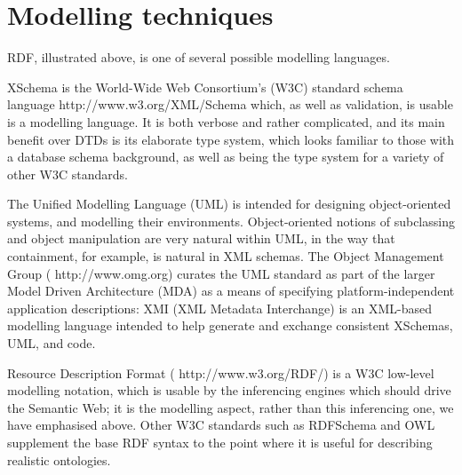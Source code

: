 \documentclass[11pt,twoside]{article}
\begin{document}
\section{Modelling techniques\label{s:techniques}}

RDF, illustrated above, is one of several possible modelling languages.

XSchema is the World-Wide Web Consortium's (W3C) \htmladdnormallink
{standard schema language} {http://www.w3.org/XML/Schema} which, as
well as validation, is usable is a modelling language.  It is both
verbose and rather complicated, and its main benefit over DTDs is its
elaborate type system, which looks familiar to those with a database
schema background, as well as being the type system for a variety of
other W3C standards.

The Unified Modelling Language (UML) is intended for designing
object-oriented systems, and modelling their environments.
Object-oriented notions of subclassing and object manipulation are
very natural within UML, in the way that containment, for example, is
natural in XML schemas.
%
The Object Management Group (
{http://www.omg.org}) curates the UML standard as part of the larger
Model Driven Architecture (MDA) as a means of specifying
platform-independent application descriptions: XMI (XML Metadata
Interchange) is an XML-based modelling language intended to help
generate and exchange consistent XSchemas, UML, and code.

Resource Description Format (
{http://www.w3.org/RDF/}) is a W3C low-level modelling notation,
which is usable by the inferencing engines which
should drive the Semantic Web; it is the modelling aspect, rather than
this inferencing one, we have emphasised above.
Other W3C standards such as RDFSchema and OWL supplement the base RDF syntax to the point where it is
useful for describing realistic ontologies.

\end{document}
